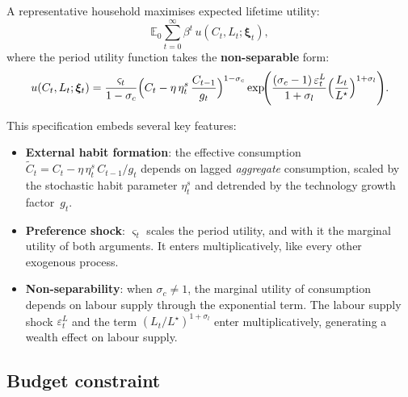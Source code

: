 \documentclass[11pt,a4paper]{article}
\newcommand{\E}{\mathbb{E}}
\begin{document}
A representative household maximises expected lifetime utility:
\begin{equation}\label{eq:utility}
  \E_0 \sum_{t=0}^{\infty} \beta^t \, u(C_t, L_t; \bm{\xi}_t),
\end{equation}
where the period utility function takes the \textbf{non-separable} form:
\begin{equation}\label{eq:period_utility}
  u(C_t, L_t; \bm{\xi}_t)
  = \frac{\varsigma_t}{1-\sigma_c}
    \Bigl(C_t - \eta\,\eta^s_t\,\frac{C_{t-1}}{g_t}\Bigr)^{1-\sigma_c}
    \exp\!\Biggl(\frac{(\sigma_c - 1)\,\varepsilon^L_t}{1+\sigma_l}
    \Bigl(\frac{L_t}{L^{\star}}\Bigr)^{1+\sigma_l}\Biggr).
\end{equation}

This specification embeds several key features:
\begin{itemize}[nosep]
  \item \textbf{External habit formation}: the effective consumption
    $\tilde C_t = C_t - \eta\,\eta^s_t \, C_{t-1}/g_t$ depends on lagged
    \emph{aggregate} consumption, scaled by the stochastic habit parameter
    $\eta^s_t$ and detrended by the technology growth factor~$g_t$.
  \item \textbf{Preference shock}: $\varsigma_t$ scales the period utility, and
    with it the marginal utility of both arguments. It enters multiplicatively,
    like every other exogenous process.
  \item \textbf{Non-separability}: when $\sigma_c \neq 1$, the marginal
    utility of consumption depends on labour supply through the exponential
    term. The labour supply shock $\varepsilon^L_t$ and the term
    $(L_t/L^{\star})^{1+\sigma_l}$ enter multiplicatively, generating a wealth
    effect on labour supply.
\end{itemize}

\subsection{Budget constraint}
\end{document}
